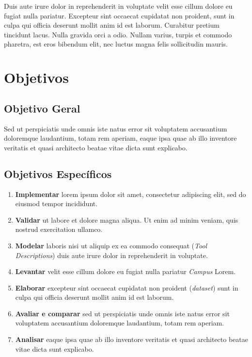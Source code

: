 Duis aute irure dolor in reprehenderit in voluptate velit esse cillum 
dolore eu fugiat nulla pariatur. Excepteur sint occaecat cupidatat non 
proident, sunt in culpa qui officia deserunt mollit anim id est laborum.
Curabitur pretium tincidunt lacus. Nulla gravida orci a odio. Nullam 
varius, turpis et commodo pharetra, est eros bibendum elit, nec luctus 
magna felis sollicitudin mauris.

\section{Objetivos}
\label{sec:objetivos}

\subsection{Objetivo Geral}

Sed ut perspiciatis unde omnis iste natus error sit voluptatem accusantium 
doloremque laudantium, totam rem aperiam, eaque ipsa quae ab illo inventore 
veritatis et quasi architecto beatae vitae dicta sunt explicabo.

\subsection{Objetivos Específicos}

\begin{enumerate}
    \item \textbf{Implementar} lorem ipsum dolor sit amet, consectetur 
    adipiscing elit, sed do eiusmod tempor incididunt.

    \item \textbf{Validar} ut labore et dolore magna aliqua. Ut enim ad 
    minim veniam, quis nostrud exercitation ullamco.

    \item \textbf{Modelar} laboris nisi ut aliquip ex ea commodo 
    consequat (\textit{Tool Descriptions}) duis aute irure dolor in 
    reprehenderit in voluptate.

    \item \textbf{Levantar} velit esse cillum dolore eu fugiat nulla 
    pariatur \textit{Campus} Lorem.

    \item \textbf{Elaborar} excepteur sint occaecat cupidatat non 
    proident (\textit{dataset}) sunt in culpa qui officia deserunt 
    mollit anim id est laborum.

    \item \textbf{Avaliar e comparar} sed ut perspiciatis unde omnis 
    iste natus error sit voluptatem accusantium doloremque laudantium, 
    totam rem aperiam.

    \item \textbf{Analisar} eaque ipsa quae ab illo inventore veritatis 
    et quasi architecto beatae vitae dicta sunt explicabo.
\end{enumerate}

